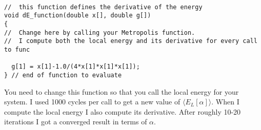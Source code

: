 \documentclass[%
twoside,                 %
final,                   %
10pt]{article}
\begin{document}
\paragraph{}
\begin{verbatim}
//  this function defines the derivative of the energy 
void dE_function(double x[], double g[])
{
//  Change here by calling your Metropolis function. 
//  I compute both the local energy and its derivative for every call to func

  g[1] = x[1]-1.0/(4*x[1]*x[1]*x[1]);
} // end of function to evaluate
\end{verbatim}
You need to change this function so that you call the local energy for your system. I used 1000
cycles per call to get a new value of $\langle E_L[\alpha]\rangle$.
When I compute the local energy I also compute its derivative.
After roughly 10-20 iterations I got a converged result in terms of $\alpha$.





\printindex
\end{document}
